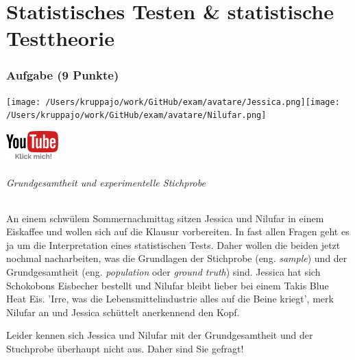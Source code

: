 \documentclass[a4paper, 9pt]{scrartcl}\usepackage[]{graphicx}\usepackage[]{xcolor}
\begin{document}
\part{Statistisches Testen \& statistische Testtheorie}

\section{Aufgabe \hfill (9 Punkte)}


 
\begin{minipage}[t]{0.5\textwidth}
\texttt{[image: /Users/kruppajo/work/GitHub/exam/avatare/Jessica.png]}\hspace{-4mm}\texttt{[image: /Users/kruppajo/work/GitHub/exam/avatare/Nilufar.png]}
\end{minipage}
\begin{minipage}[t]{0.5\textwidth}
\hfill
\href{https://youtu.be/aHVYuFKTqZs}{\includegraphics[width = 2cm]{img/youtube}}
\end{minipage}



\paragraph{Grundgesamtheit und experimentelle Stichprobe}

An einem schwülem Sommernachmittag sitzen Jessica und Nilufar in einem Eiskaffee und wollen sich auf die Klausur vorbereiten. In fast allen Fragen geht es ja um die Interpretation eines statistischen Tests. Daher wollen die beiden jetzt nochmal nacharbeiten, was die Grundlagen der Stichprobe (eng. \textit{sample}) und der Grundgesamtheit (eng. \textit{population} oder \textit{ground truth}) sind. Jessica hat sich Schokobons Eisbecher bestellt und Nilufar bleibt lieber bei einem Takis Blue Heat Eis. 'Irre, was die Lebensmittelindustrie alles auf die Beine kriegt', merk Nilufar an und Jessica schüttelt anerkennend den Kopf.

\vspace{1ex}

Leider kennen sich Jessica und Nilufar mit der Grundgesamtheit und der Stuchprobe überhaupt nicht aus. Daher sind Sie gefragt!
\end{document}
